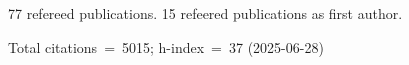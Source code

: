 77 refereed publications. 15 refeered publications as first author.

Total citations~=~5015; h-index~=~37 (2025-06-28)